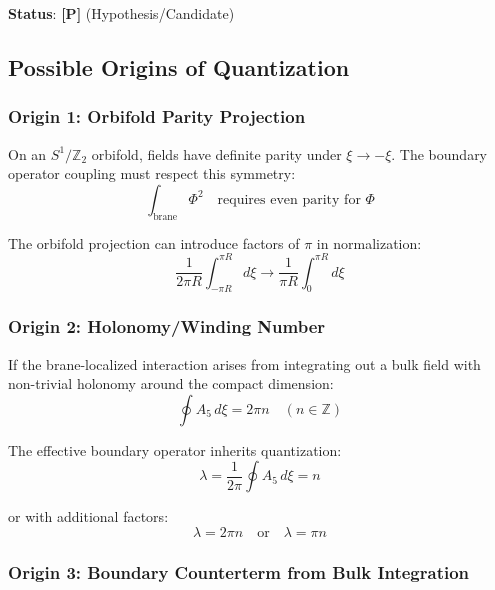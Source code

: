 \documentclass[11pt,a4paper]{article}
\newcommand{\tagP}{\textbf{[P]}}
\theoremstyle{definition}
\theoremstyle{plain}
\theoremstyle{remark}
\begin{document}
\textbf{Status}: \tagP{} (Hypothesis/Candidate)

\subsection{Possible Origins of Quantization}

\subsubsection{Origin 1: Orbifold Parity Projection}

On an $S^1/\mathbb{Z}_2$ orbifold, fields have definite parity under $\xi \to -\xi$.
The boundary operator coupling must respect this symmetry:
\begin{equation}
\int_{\mathrm{brane}} \Phi^2 \quad \text{requires even parity for } \Phi
\label{eq:parity}
\end{equation}

The orbifold projection can introduce factors of $\pi$ in normalization:
\begin{equation}
\frac{1}{2\pi R} \int_{-\pi R}^{\pi R} d\xi \to \frac{1}{\pi R} \int_0^{\pi R} d\xi
\label{eq:orbifold-norm}
\end{equation}

\subsubsection{Origin 2: Holonomy/Winding Number}

If the brane-localized interaction arises from integrating out a bulk field
with non-trivial holonomy around the compact dimension:
\begin{equation}
\oint A_5 \, d\xi = 2\pi n \quad (n \in \mathbb{Z})
\label{eq:holonomy}
\end{equation}

The effective boundary operator inherits quantization:
\begin{equation}
\lambda = \frac{1}{2\pi}\oint A_5 \, d\xi = n
\label{eq:lambda-from-holonomy}
\end{equation}

or with additional factors:
\begin{equation}
\lambda = 2\pi n \quad \text{or} \quad \lambda = \pi n
\label{eq:lambda-variants}
\end{equation}

\subsubsection{Origin 3: Boundary Counterterm from Bulk Integration}
\end{document}
